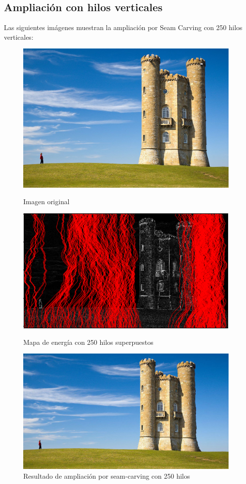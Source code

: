 \documentclass[12pt,a4paper,oneside]{article}
\begin{document}
\subsection{Ampliación con hilos verticales}
Las siguientes imágenes muestran la ampliación por Seam Carving con 250 hilos verticales:
\begin{figure}[!htb]
      \includegraphics[width=\linewidth]{Broadway_tower_edit.jpg}
      \caption{Imagen original}\label{kinkakujiorig}
    \endminipage\hfill
      \includegraphics[width=\linewidth]{250-enlargementenergyv.png}
      \caption{Mapa de energía con 250 hilos superpuestos}\label{kinkakujienergy}
    \endminipage\hfill
      \includegraphics[width=\linewidth]{250-enlargementv.jpg}
      \caption{Resultado de ampliación por seam-carving con 250 hilos}\label{kinkakujiseam}
    \endminipage
\end{figure}
\end{document}
